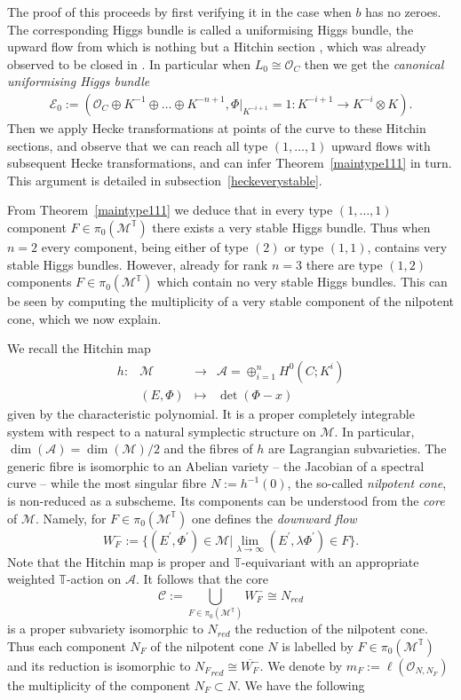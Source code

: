 \documentclass[12pt]{article}
\numberwithin{equation}{section}
\theoremstyle{remark}
\theoremstyle{definition}
\numberwithin{theorem}{section}
\def\beq{\begin{eqnarray}}
\def\eeq{\end{eqnarray}}
\def\calE{{\mathcal E}}
\def\M{{\mathcal{M}}}
\def\calA{{\mathcal{A}}}
\newcommand{\T}{{\mathbb{T}}}
\def\calC{{\mathcal C}}
\def\calO{{\mathcal O}}
\renewcommand{\1}{\mathbbm{1}}
\begin{document}
The proof of this proceeds by first verifying it in the case when $b$ has no zeroes. The corresponding Higgs bundle is called a uniformising Higgs bundle, the upward flow from which is nothing but a Hitchin section \cite{hitchin-lie}, which was already observed to be closed  in \cite{hitchin-lie}. In particular when $L_0\cong \calO_C$ then we get the {\em canonical uniformising Higgs bundle} \beq\label{canuni} \calE_0:=(\calO_C\oplus K^{-1}\oplus \dots \oplus K^{-n+1},\Phi|_{K^{-i+1}}=1:K^{-i+1}\to K^{-i}\otimes K).\eeq Then we apply Hecke transformations  at points of the curve to these Hitchin sections, and observe that we can reach all type $(1,\dots,1)$ upward flows with subsequent Hecke transformations, and can infer Theorem~\ref{maintype111} in turn. This argument is detailed in subsection~\ref{heckeverystable}.

From Theorem~\ref{maintype111} we  deduce that in every type $(1,\dots,1)$ component $F\in\pi_0(\M^\T)$ there exists a very stable Higgs bundle. Thus  when $n=2$ every component, being either of type $(2)$ or type $(1,1)$, contains very stable Higgs bundles. However, already for rank $n=3$ there are type $(1,2)$ components $F\in\pi_0(\M^\T)$ which contain no very stable Higgs bundles. This can be seen by computing the multiplicity of a very stable component of the nilpotent cone, which we now explain. 

We recall the Hitchin map \cite{hitchin-stable} $$\begin{array}{cccc} h:&\M&\to &\calA=\oplus_{i=1}^n  H^0(C;K^i)\\ &(E,\Phi)&\mapsto & \det(\Phi-x)\end{array} $$ given by the characteristic polynomial. It is a proper completely integrable system \cite{nitsure,hitchin-stable} with respect to a natural symplectic structure on $\M$. In particular, $\dim(\calA)=\dim(\M)/2$ and the fibres of $h$ are Lagrangian subvarieties. The generic fibre is isomorphic to an Abelian variety -- the Jacobian of a  spectral curve -- while the most singular fibre $N:=h^{-1}(0)$, the so-called {\em nilpotent cone}, is non-reduced as a subscheme. Its components can be understood from the {\em core} of $\M$. Namely, for  $F\in {\pi_0(\M^\T)}$  one defines the {\em downward flow} $$ W^-_F:=\{(E^\prime,\Phi^\prime)\in \M | \lim_{\lambda \to \infty} (E^\prime,\lambda\Phi^\prime)\in F\}.$$ Note that the Hitchin map is proper and $\T$-equivariant with an appropriate weighted $\T$-action on $\calA$. It follows that the  core  $$\calC:=\bigcup_{F\in \pi_0(\M^\T)}W^-_F\cong N_{red}$$ is a proper subvariety isomorphic to $N_{red}$ the reduction of the nilpotent cone. Thus each component $N_F$ of the nilpotent cone $N$ is labelled by $F\in \pi_0(\M^{\T})$ and its reduction is isomorphic to ${N_F}_{red}\cong\overline{W^-_F}$. We denote by $m_F:=\ell(\calO_{N,N_F})$ the multiplicity of the component $N_F\subset N$. We have the following
\end{document}

